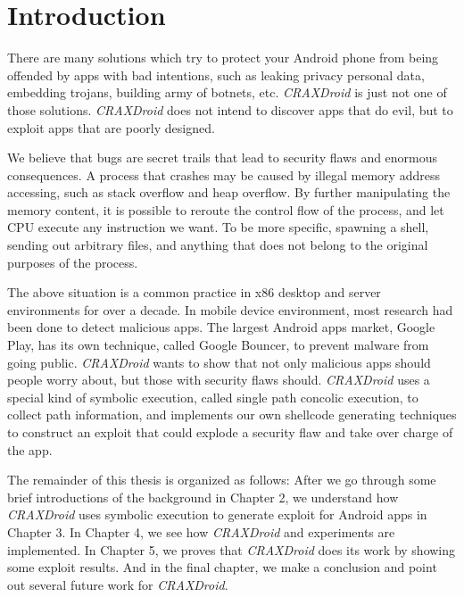 \chapter{Introduction}

There are many solutions\autocite{enck2010taintdroid}\autocite{yan2012droidscope}\autocite{yang2013appintent}\autocite{zhou2013detecting} which try to protect your Android phone from
being offended by apps with bad intentions, such as leaking privacy personal
data, embedding trojans, building army of botnets, etc. \emph{CRAXDroid} is
just not one of those solutions. \emph{CRAXDroid} does not intend to discover
apps that do evil, but to exploit apps that are poorly designed.

We believe that bugs are secret trails that lead to security flaws and enormous
consequences. A process that crashes may be caused by illegal memory address
accessing, such as stack overflow and heap overflow. By further manipulating
the memory content, it is possible to reroute the control flow of the process,
and let CPU execute any instruction we want. To be more specific, spawning a
shell, sending out arbitrary files, and anything that does not belong to the
original purposes of the process.

The above situation is a common practice in x86 desktop and server environments
for over a decade. In mobile device environment, most research had been done to
detect malicious apps. The largest Android apps market, Google Play, has its
own technique, called Google Bouncer\autocite{google2012bouncer}, to prevent
malware from going public. \emph{CRAXDroid} wants to show that not only
malicious apps should people worry about, but those with security flaws should.
\emph{CRAXDroid} uses a special kind of symbolic execution, called single path
concolic execution, to collect path information, and implements our own
shellcode generating techniques to construct an exploit that could explode a
security flaw and take over charge of the app.

The remainder of this thesis is organized as follows: After we go through some
brief introductions of the background in Chapter 2, we understand how
\emph{CRAXDroid} uses symbolic execution to generate exploit for Android apps
in Chapter 3. In Chapter 4, we see how \emph{CRAXDroid} and experiments are
implemented. In Chapter 5, we proves that \emph{CRAXDroid} does its work by
showing some exploit results. And in the final chapter, we make a conclusion
and point out several future work for \emph{CRAXDroid}.
